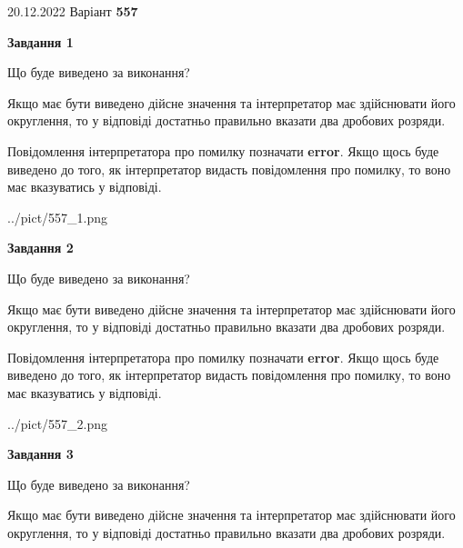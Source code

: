 \documentclass[12pt, ukrainian]{article}
\begin{document}
{20.12.2022 Варіант \No \textbf { 557 }\par}
{
\begin {Large}

{\begin {center}\textbf{Завдання 1}\end {center}}\par
Що буде виведено за виконання? \par

Якщо має бути виведено дійсне значення та інтерпретатор має здійснювати його округлення, 
то у відповіді достатньо правильно вказати два дробових розряди.

Повідомлення інтерпретатора про помилку позначати \textbf{error}.
Якщо щось буде виведено до того, як інтерпретатор видасть повідомлення про помилку, 
то воно має вказуватись у відповіді. \par

\begin{center}
	{../pict/557_1.png}
\end{center}
\newpage

{\begin {center}\textbf{Завдання 2}\end {center}}\par
Що буде виведено за виконання? \par

Якщо має бути виведено дійсне значення та інтерпретатор має здійснювати його округлення, 
то у відповіді достатньо правильно вказати два дробових розряди.

Повідомлення інтерпретатора про помилку позначати \textbf{error}.
Якщо щось буде виведено до того, як інтерпретатор видасть повідомлення про помилку, 
то воно має вказуватись у відповіді. \par

\begin{center}
	{../pict/557_2.png}
\end{center}
\newpage

{\begin {center}\textbf{Завдання 3}\end {center}}\par
Що буде виведено за виконання? \par

Якщо має бути виведено дійсне значення та інтерпретатор має здійснювати його округлення, 
то у відповіді достатньо правильно вказати два дробових розряди.


\end{Large}}
\end{document}
